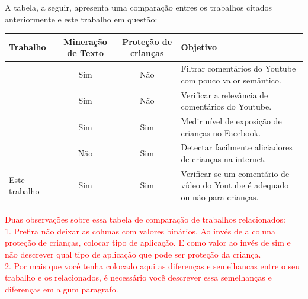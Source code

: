 A tabela, a seguir, apresenta uma comparação entres os trabalhos citados anteriormente e este trabalho em questão:
\begin{table}[H]
	{%
		\begin{tabular}{p{3cm}ccp{4.5cm}} %
			\toprule
			Trabalho & Mineração de Texto & Proteção de crianças &  Objetivo\\
			\midrule \midrule
    		\cite{ammari2011filteringYt} & Sim & Não & Filtrar comentários do Youtube com pouco valor semântico.\\
    		\hline	
			\cite{schultes2013leave} & Sim & Não & Verificar a relevância de comentários do Youtube.\\
			\hline
			\cite{marioFalcao2016} & Sim & Sim & Medir nível de exposição de crianças no Facebook.\\
			\hline
			\cite{EnyoGoncalves2017} & Não & Sim & Detectar facilmente aliciadores de crianças na internet.\\
			\hline
			Este trabalho & Sim & Sim & Verificar se um comentário de vídeo do Youtube é adequado ou não para crianças.\\
			\bottomrule
		\end{tabular}%
	}{%
}
\end{table}



\textcolor{red}{Duas observações sobre essa tabela de comparação de trabalhos relacionados: \\
1. Prefira não deixar as colunas com valores binários. Ao invés de a coluna proteção de crianças, colocar tipo de aplicação. E como valor ao invés de sim e não descrever qual tipo de aplicação que pode ser proteção da criança.\\ %
2. Por mais que você tenha colocado aqui as diferenças e semelhancas entre o seu trabalho e os relacionados, é necessário você descrever essa semelhanças e diferenças em algum paragrafo.} %

